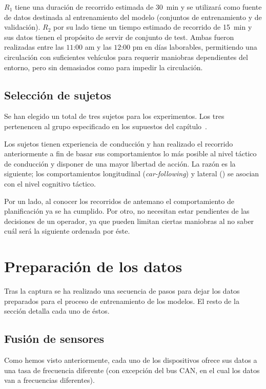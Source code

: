 $R_1$ tiene una duración de recorrido estimada de \SI{30}{\minute} y se utilizará como fuente de datos destinada al entrenamiento del modelo (conjuntos de entrenamiento y de validación). $R_2$ por su lado tiene un tiempo estimado de recorrido de \SI{15}{\minute} y sus datos tienen el propósito de servir de conjunto de test. Ambas fueron realizadas entre las $11$:$00$ am y las $12$:$00$ pm en días laborables, permitiendo una circulación con suficientes vehículos para requerir maniobras dependientes del entorno, pero sin demasiados como para impedir la circulación.

\subsection{Selección de sujetos}

Se han elegido un total de tres sujetos para los experimentos. Los tres pertenencen al grupo especificado en los supuestos del capítulo~.

Los sujetos tienen experiencia de conducción y han realizado el recorrido anteriormente a fin de basar sus comportamientos lo más posible al nivel táctico de conducción y disponer de una mayor libertad de acción. La razón es la siguiente; los comportamientos longitudinal (\textit{\gls{car-following}}) y lateral (\textit{}) se asocian con el nivel cognitivo táctico.

Por un lado, al conocer los recorridos de antemano el comportamiento de planificación ya se ha cumplido. Por otro, no necesitan estar pendientes de las decisiones de un operador, ya que pueden limitan ciertas maniobras al no saber cuál será la siguiente ordenada por éste.

\section{Preparación de los datos}

Tras la captura se ha realizado una secuencia de pasos para dejar los datos preparados para el proceso de entrenamiento de los modelos. El resto de la sección detalla cada uno de éstos.

\subsection{Fusión de sensores}

Como hemos visto anteriormente, cada uno de los dispositivos ofrece sus datos a una tasa de frecuencia diferente (con excepción del bus CAN, en el cual los datos van a frecuencias diferentes).

